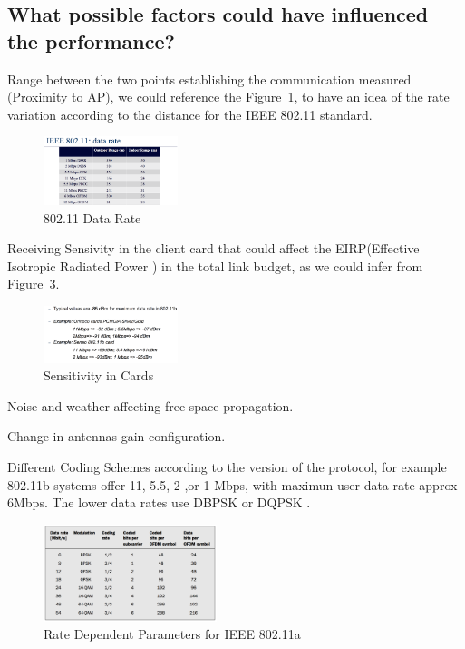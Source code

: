 \documentclass [12 pt , a4paper ] {article}
\begin{document}
 \subsection{What possible factors could have influenced the performance?}
\par Range between the two points establishing the communication measured (Proximity to AP),
we could reference the Figure~\ref{fig:wifi}, to have an idea of the rate variation
according to the distance for the IEEE 802.11 standard.
\begin{figure}[!ht]
  \centering
  \includegraphics[scale=0.2,width=0.35\textwidth, natwidth=7000,natheight=1000]{3.png}
  \caption{802.11 Data Rate \cite{langar}}
  \label{fig:wifi}
\end{figure}
\par Receiving Sensivity in the client card that could affect the EIRP(Effective
Isotropic Radiated Power \cite{schiller}) in the total link budget, as we could infer from
Figure~\ref{fig:sensitivity}.
\begin{figure}[!ht]
  \centering
  \includegraphics[scale=0.2,width=0.35\textwidth, natwidth=7000,natheight=1000]{4.png}
  \caption{Sensitivity in Cards \cite{schiller}}
  \label{fig:sensitivity}
\end{figure}
\par Noise and weather affecting free space propagation.
\par Change in antennas gain configuration.
\par Different Coding Schemes according to the version of the protocol, for example 802.11b
systems offer 11, 5.5, 2 ,or 1 Mbps, with maximun user data rate approx 6Mbps. The
lower data rates use DBPSK or DQPSK \cite{schiller}.
\begin{figure}[!ht]
  \centering
  \includegraphics[scale=0.2,width=0.45\textwidth, natwidth=7000,natheight=1000]{5.png}
  \caption{Rate Dependent Parameters for IEEE 802.11a \cite{schiller}}
  \label{fig:sensitivity}
\end{figure}
\end{document}
